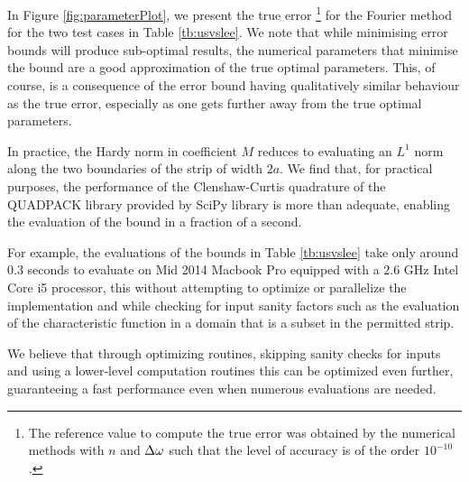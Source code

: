 \documentclass[11pt]{amsart}
\begin{document}
In Figure \ref{fig:parameterPlot}, we present the true error
\footnote{The reference value to compute the true error was
obtained by the numerical methods with $n$ and $\Delta\omega$ such
that the level of accuracy is of the order $10^{-10}$.} for the Fourier method
for the two test cases in Table \ref{tb:usvslee}. 
 We note that while minimising error
bounds will produce sub-optimal results, the numerical parameters that minimise
the bound are a good approximation of the true optimal parameters. 
This, of course,
is a consequence of the error bound having qualitatively similar behaviour as
the true error, especially as one gets further away from the true optimal parameters.

\begin{remark}
In practice, the Hardy norm in coefficient $M$ reduces to evaluating an
$L^1$ norm along the two boundaries of the strip of width $2a$.
We find that, for practical purposes, the performance of the
Clenshaw-Curtis quadrature of the
QUADPACK library provided by SciPy library is more than adequate,
enabling the evaluation of the bound in a fraction of a second.

For example, the evaluations of the bounds in Table
\ref{tb:usvslee} take only around $0.3$ seconds to evaluate
on Mid 2014 Macbook Pro equipped with a
2.6 GHz Intel Core i5 processor, this without attempting to optimize
or parallelize the implementation and while checking for input sanity
factors such as the evaluation of the characteristic function in a domain
that is a subset in the permitted strip.

We believe that through optimizing routines, skipping sanity checks for inputs
and using a lower-level computation routines this can be optimized even further,
guaranteeing a fast performance even when numerous evaluations are needed.

\end{remark}
\end{document}
